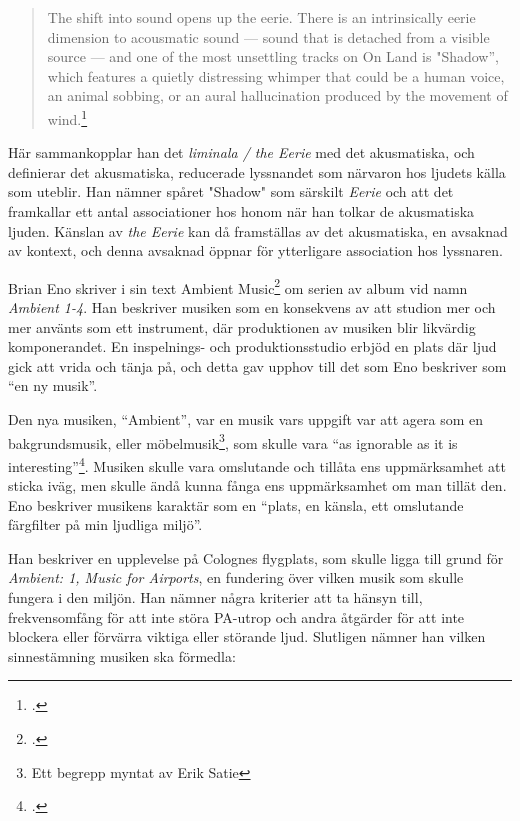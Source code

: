 \documentclass{article}
\begin{document}
\begin{quote}
The shift into sound opens up the eerie. There is an intrinsically eerie dimension to acousmatic sound — sound
that is detached from a visible source — and one of the most unsettling tracks on On Land is "Shadow”, which
features a quietly distressing whimper that could be a human voice, an animal sobbing, or an aural
hallucination produced by the movement of wind.\footcite[81]{Fisher}
\end{quote}

Här sammankopplar han det \emph{liminala / the Eerie} med det akusmatiska, och definierar det akusmatiska,
reducerade lyssnandet som närvaron hos ljudets källa som uteblir. Han nämner spåret "Shadow" som särskilt
\emph{Eerie} och att det framkallar ett antal associationer hos honom när han tolkar de akusmatiska ljuden.
Känslan av \emph{the Eerie} kan då framställas av det akusmatiska, en avsaknad av kontext, och denna avsaknad
öppnar för ytterligare association hos lyssnaren.

Brian Eno skriver i sin text Ambient Music\footcite[149-153]{Eno} om serien av album vid namn \emph{Ambient
1-4}. Han beskriver musiken som en konsekvens av att studion mer och mer använts som ett instrument, där
produktionen av musiken blir likvärdig komponerandet. En inspelnings- och produktionsstudio erbjöd en plats
där ljud gick att vrida och tänja på, och detta gav upphov till det som Eno beskriver som ``en ny musik''.

Den nya musiken, ``Ambient'', var en musik vars uppgift var att agera som en bakgrundsmusik, eller
möbelmusik\footnote{Ett begrepp myntat av Erik Satie}, som skulle vara ``as ignorable as it is
interesting''\footcite{Airports}. Musiken skulle vara omslutande och tillåta ens uppmärksamhet att sticka
iväg, men skulle ändå kunna fånga ens uppmärksamhet om man tillät den. Eno beskriver musikens karaktär som en
``plats, en känsla, ett omslutande färgfilter på min ljudliga miljö''.

Han beskriver en upplevelse på Colognes flygplats, som skulle ligga till grund för \emph{Ambient: 1, Music for
Airports}, en fundering över vilken musik som skulle fungera i den miljön. Han nämner några kriterier att ta
hänsyn till, frekvensomfång för att inte störa PA-utrop och andra åtgärder för att inte blockera eller
förvärra viktiga eller störande ljud. Slutligen nämner han vilken sinnestämning musiken ska förmedla:
\end{document}
